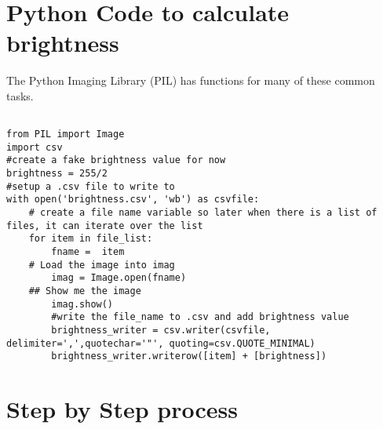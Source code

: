 \documentclass{article}
\begin{document}
\section*{Python Code to calculate brightness}
The Python Imaging Library (PIL) has functions for many of these common tasks.


\begin{lstlisting}

from PIL import Image
import csv
#create a fake brightness value for now
brightness = 255/2
#setup a .csv file to write to
with open('brightness.csv', 'wb') as csvfile:
    # create a file name variable so later when there is a list of files, it can iterate over the list 
    for item in file_list:
        fname =  item
    # Load the image into imag
        imag = Image.open(fname)
    ## Show me the image
        imag.show()
        #write the file_name to .csv and add brightness value
        brightness_writer = csv.writer(csvfile, delimiter=',',quotechar='"', quoting=csv.QUOTE_MINIMAL)
        brightness_writer.writerow([item] + [brightness])

\end{lstlisting}

\section{Step by Step process}






\end{document}
